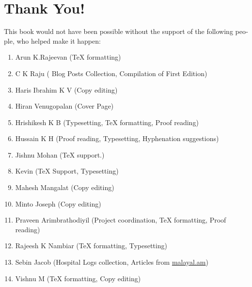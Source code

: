 \section*{Thank You!}
\begin{english}
This book would not have been possible without the support of the following 
people, who helped make it happen:
\begin{enumerate}
 \item Arun K.Rajeevan ({\TeX} formatting)
 \item C K Raju ( Blog Posts Collection, Compilation of First Edition)
 \item Haris Ibrahim K V (Copy editing)
 \item Hiran Venugopalan (Cover Page)
 \item Hrishikesh K B (Typesetting, {\TeX} formatting, Proof reading)
 \item Hussain K H (Proof reading, Typesetting, Hyphenation suggestions)
 \item Jishnu Mohan ({\TeX} support.)
 \item Kevin ({\TeX} Support, Typesetting)
  \item Mahesh Mangalat (Copy editing)
 \item Minto Joseph (Copy editing)
 \item Praveen Arimbrathodiyil (Project coordination, {\TeX} formatting, Proof reading)
 \item Rajeesh K Nambiar ({\TeX} formatting, Typesetting)
 \item Sebin Jacob (Hospital Logs collection, Articles from \url{malayal.am})
 \item Vishnu M ({\TeX} formatting, Copy editing)
 
\end{enumerate}
\end{english}
\newpage
